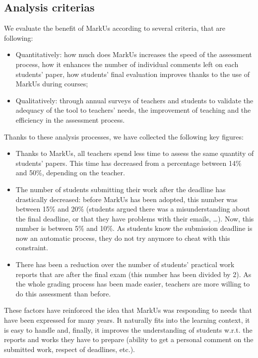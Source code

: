 \documentclass[twocolumn,10pt]{asme2e}
\begin{document}
\subsection*{Analysis criterias}

We evaluate the benefit of MarkUs according to several criteria, that are following: 
\begin{itemize}
\item Quantitatively: how much does MarkUs increases the speed of the assessment process, how it enhances the number of individual comments left on each students' paper, how students' final evaluation improves thanks to the use of MarkUs during courses;
\item Qualitatively: through annual surveys of teachers and students to validate the adequacy of the tool to teachers' needs, the improvement of teaching and the efficiency in the assessment process.
\end{itemize}

Thanks to these analysis processes, we have collected the following key figures: 
\begin{itemize}
\item Thanks to MarkUs, all teachers spend less time to assess the same quantity of students' papers. This time has decreased from a percentage between 14\% and 50\%, depending on the teacher. 
\item The number of students submitting their work after the deadline has drastically decreased: before MarkUs has been adopted, this number was between 15\% and 20\% (students argued there was a misunderstanding about the final deadline, or that they have problems with their emails, …).  Now, this number is between 5\% and 10\%. As students know the submission deadline is now an automatic process, they do not try anymore to cheat with this constraint. 
\item There has been a reduction over the number of students' practical work reports that are after the final exam (this number has been divided by 2). As the whole grading process has been made easier, teachers are more willing to do this assessment than before. 
\end{itemize}

These factors have reinforced the idea that MarkUs was responding to needs that have been expressed for many years. It naturally fits into the learning context, it is easy to handle and, finally, it improves the understanding of students w.r.t. the reports and works they have to prepare (ability to get a personal comment on the submitted work, respect of deadlines, etc.).
\end{document}
